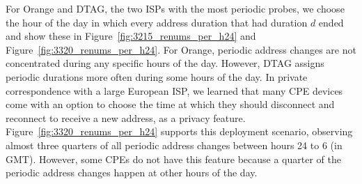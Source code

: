 For Orange and DTAG, the two ISPs with the most periodic probes, we
choose the hour of the day in which every address duration that had
duration $d$ ended and show these in Figure~\ref{fig:3215_renums_per_h24}
and Figure~\ref{fig:3320_renums_per_h24}. For Orange, periodic address
changes are not concentrated during any specific hours of
the day. However, DTAG assigns periodic
durations more often during some hours of the day. In private
correspondence with a large European ISP, we learned that many CPE devices come with an option to choose the time
at which they should disconnect and reconnect to receive a new
address, as a privacy
feature. Figure~\ref{fig:3320_renums_per_h24} supports this
deployment scenario, observing almost three quarters of all periodic
address changes between hours 24 to 6 (in GMT). However, some
CPEs do not have this feature because a quarter of the periodic
address changes happen at other hours of the day.
